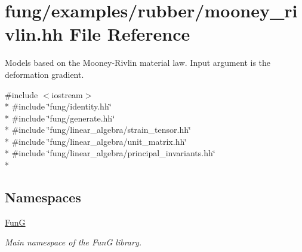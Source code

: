 \hypertarget{mooney__rivlin_8hh}{}\section{fung/examples/rubber/mooney\+\_\+rivlin.hh File Reference}
\label{mooney__rivlin_8hh}


Models based on the Mooney-\/\+Rivlin material law. Input argument is the deformation gradient.  


{\ttfamily \#include $<$iostream$>$}\\*
{\ttfamily \#include \char`\"{}fung/identity.\+hh\char`\"{}}\\*
{\ttfamily \#include \char`\"{}fung/generate.\+hh\char`\"{}}\\*
{\ttfamily \#include \char`\"{}fung/linear\+\_\+algebra/strain\+\_\+tensor.\+hh\char`\"{}}\\*
{\ttfamily \#include \char`\"{}fung/linear\+\_\+algebra/unit\+\_\+matrix.\+hh\char`\"{}}\\*
{\ttfamily \#include \char`\"{}fung/linear\+\_\+algebra/principal\+\_\+invariants.\+hh\char`\"{}}\\*
\subsection*{Namespaces}
\begin{DoxyCompactItemize}
\item 
 \hyperlink{namespaceFunG}{Fun\+G}
\begin{DoxyCompactList}\small\item\em Main namespace of the Fun\+G library. \end{DoxyCompactList}\end{DoxyCompactItemize}

